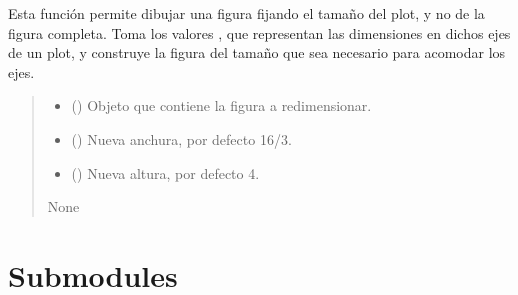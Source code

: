 \documentclass[letterpaper,10pt,english]{sphinxmanual}
\begin{document}

\begin{fulllineitems}
\label{\detokenize{utils:utils.set_size_plt}}
\pysigstartsignatures
{}
\pysigstopsignatures
\sphinxAtStartPar
Esta función permite dibujar una figura fijando el tamaño del plot, y no de la figura completa. Toma los valores ,  que representan las dimensiones en dichos ejes de un plot, y construye la figura del tamaño que sea necesario para acomodar los ejes.
\begin{quote}\begin{description}
\begin{itemize}
\item {} 
\sphinxAtStartPar
{} () \textendash{} Objeto que contiene la figura a redimensionar.

\item {} 
\sphinxAtStartPar
{} (\sphinxstyleliteralemphasis{\sphinxupquote{, }}) \textendash{} Nueva anchura, por defecto 16/3.

\item {} 
\sphinxAtStartPar
{} (\sphinxstyleliteralemphasis{\sphinxupquote{, }}) \textendash{} Nueva altura, por defecto 4.

\end{itemize}

\sphinxAtStartPar
None

\end{description}\end{quote}

\end{fulllineitems}



\section{Submodules}
\label{\detokenize{utils:submodules}}
\sphinxstepscope
\end{document}
